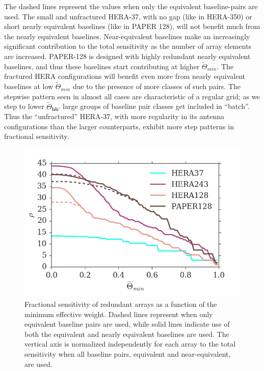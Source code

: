 \documentclass[twocolumn,apj,numberedappendix]{emulateapj}
\renewcommand\[{\begin{equation}}
\renewcommand\]{\end{equation}}
\begin{document}
The dashed lines represent the values when only the equivalent baseline-pairs are used. The small and unfractured HERA-37, with no gap (like in HERA-350) or short nearly equivalent baselines (like in PAPER 128), will not benefit much from the nearly equivalent baselines. Near-equivalent baselines make an increasingly significant contribution to the total sensitivity as the number of array elements are increased. PAPER-128 is designed with highly redundant nearly equivalent baselines, and thus  these baselines start contributing at higher $\widetilde{\Theta}_{min}$. The fractured HERA configurations will benefit even more from nearly equivalent baselines at low $\widetilde{\Theta}_{min}$ due to the presence of more classes of such pairs. The stepwise pattern seen in almost all cases are characteristic of a regular grid; as we step to lower $\widetilde{\Theta}_{\boldsymbol{bb'}}$ large groups of baseline pair classes get included in ``batch''. Thus the ``unfractured'' HERA-37, with more regularity in its antenna configurations than the larger counterparts, exhibit more step patterns in fractional sensitivity. 
\begin{figure}[H]
\includegraphics[width=\linewidth]{osens}
\caption{Fractional sensitivity of redundant arrays as a function of the minimum effective weight. Dashed lines represent when only equivalent baseline pairs are used, while solid lines indicate use of both the equivalent and nearly equivalent baselines are used. The vertical axis is normalized independently for each array to the total sensitivity when all baseline pairs, equivalent and near-equivalent, are used.}
\label{fig:osens}
\end{figure}
\end{document}
